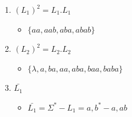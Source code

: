 \documentclass[12pt]{article}
\begin{document}
\begin{enumerate}
\begin{enumerate}[label=\alph*.]
        \item $(L_1)^2 = L_1.L_1$
        \begin{itemize}[label=R:]
            \item $\{aa,aab,aba,abab\}$
        \end{itemize}
        \item $(L_2)^2 = L_2.L_2$
        \begin{itemize}[label=R:]
            \item $\{\lambda,a,ba,aa,aba,baa,baba\}$
        \end{itemize}
        \item $\bar{L_1}$
        \begin{itemize}[label=R:]
            \item $\bar{L_1}=\Sigma^*-L_1={a,b}^*-{a,ab}$
        \end{itemize}
    \end{enumerate}
\end{enumerate}
\end{document}
